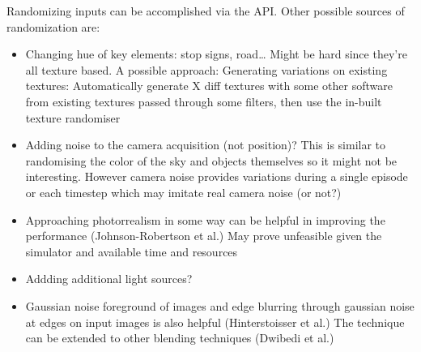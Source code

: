 Randomizing inputs can be accomplished via the API. Other possible sources of randomization are:
\begin{itemize}
    \item Changing hue of key elements: stop signs, road… Might be hard since they’re all texture based. A possible approach: Generating variations on existing textures: Automatically generate X diff textures with some other software from existing textures passed through some filters, then use the in-built texture randomiser
    \item Adding noise to the camera acquisition (not position)? This is similar to randomising the color of the sky and objects themselves so it might not be interesting. However camera noise provides variations during a single episode or each timestep which may imitate real camera noise (or not?)
    \item Approaching photorrealism in some way can be helpful in improving the performance (Johnson-Robertson et al.) May prove unfeasible given the simulator and available time and resources
    \item Addding additional light sources?
    \item Gaussian noise foreground of images and edge blurring through gaussian noise at edges on input images is also helpful (Hinterstoisser et al.) The technique can be extended to other blending techniques (Dwibedi et al.)
\end{itemize}

